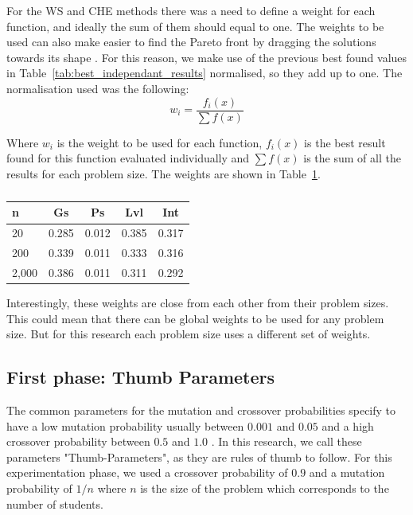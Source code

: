 For the WS and CHE methods there was a need to define a weight for each function, and ideally the sum of them should equal to one. The weights to be used can also make easier to find the Pareto front by dragging the solutions towards its shape \cite{Emmerich2018}. For this reason, we make use of the previous best found values in Table~\ref{tab:best_independant_results} normalised, so they add up to one. The normalisation used was the following:\\

\begin{equation}
    w_i = \frac{f_i(x)}{\sum f(x)}
\end{equation}

Where $w_i$ is the weight to be used for each function, $f_i(x)$ is the best result found for this function evaluated individually and $\sum f(x)$ is the sum of all the results for each problem size. The weights are shown in Table~\ref{tab:weights_to_be_used}.\\

\par
\begin{table}[!htp]
\centering
\begin{tabular}{@{}lcccc@{}}
\toprule
n     & Gs    & Ps    & Lvl   & Int   \\ \midrule
20    & 0.285 & 0.012 & 0.385 & 0.317 \\
200   & 0.339 & 0.011 & 0.333 & 0.316 \\
2,000 & 0.386 & 0.011 & 0.311 & 0.292 \\ \bottomrule
\end{tabular}%
\caption{}
\label{tab:weights_to_be_used}
\end{table}

Interestingly, these weights are close from each other from their problem sizes. This could mean that there can be global weights to be used for any problem size. But for this research each problem size uses a different set of weights.\\

\subsection{First phase: Thumb Parameters}
\label{sec:first-phase}

The common parameters for the mutation and crossover probabilities specify to have a low mutation probability usually between $0.001$ and $0.05$ and a high crossover probability between $0.5$ and $1.0$  \cite{Lin2003}. In this research, we call these parameters "Thumb-Parameters", as they are rules of thumb to follow. For this experimentation phase, we used a crossover probability of $0.9$ and a mutation probability of $1/n$ where $n$ is the size of the problem which corresponds to the number of students. \\

